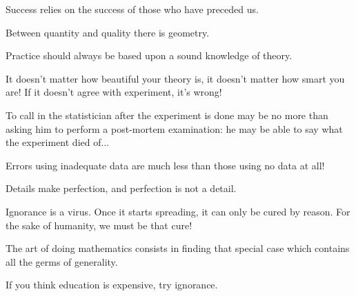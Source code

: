 	\begin{fuquote}[?]Success relies on the success of those who have preceded us.
 	\end{fuquote}
 	
 	\begin{fuquote}Between quantity and quality there is geometry.
 	\end{fuquote}

	\begin{fuquote}Practice should always be based upon a sound knowledge of theory.
 	\end{fuquote}
 	
 	\begin{fuquote}It doesn't matter how beautiful your theory is, it doesn't matter how smart you are! If it doesn't agree with experiment, it's wrong!
 	\end{fuquote}
 	
 	\begin{fuquote}To call in the statistician after the experiment is done may be no more than asking him to perform a post-mortem examination: he may be able to say what the experiment died of...
 	\end{fuquote}
 	
 	\begin{fuquote}Errors using inadequate data are much less than those using no data at all!
 	\end{fuquote}
 	
 	\begin{fuquote}Details make perfection, and perfection is not a detail.
 	\end{fuquote}
 	
 	\begin{fuquote}Ignorance is a virus. Once it starts spreading, it can only be cured by reason. For the sake of humanity, we must be that cure!
 	\end{fuquote}
 	
 	\begin{fuquote}The art of doing mathematics consists in finding that special case which contains all the germs of generality. 
 	\end{fuquote}

 	\begin{fuquote}If you think education is expensive, try ignorance.
 	\end{fuquote}
 	
